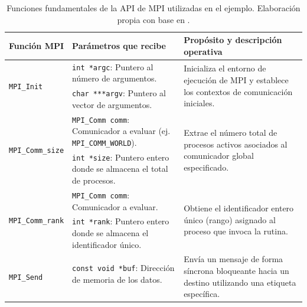 \begin{table}[h]
	\centering
	\caption{Funciones fundamentales de la API de MPI utilizadas en el ejemplo. Elaboración propia con base en \cite{grama_intro_parallel_2003, gropp_using_mpi_1999, pacheco_2011, mpi_forum_2025}.}
	\label{tab:funciones_ejemplo}
	\begin{tabular}{|l|p{6.0cm}|p{5.0cm}|}
		\hline
		\textbf{Función MPI}                      & \textbf{Parámetros que recibe}                                                  & \textbf{Propósito y descripción operativa}                                                                                     \\ \hline
		\multirow{2}{*}{\texttt{MPI\_Init}}       & \texttt{int *argc}: Puntero al número de argumentos.                            & \multirow{2}{5.0cm}{Inicializa el entorno de ejecución de MPI y establece los contextos de comunicación iniciales.}            \\ \cline{2-2}
		                                          & \texttt{char ***argv}: Puntero al vector de argumentos.                         &                                                                                                                                \\ \hline
		\multirow{2}{*}{\texttt{MPI\_Comm\_size}} & \texttt{MPI\_Comm comm}: Comunicador a evaluar (ej. \texttt{MPI\_COMM\_WORLD}). & \multirow{2}{5.0cm}{Extrae el número total de procesos activos asociados al comunicador global especificado.}                  \\ \cline{2-2}
		                                          & \texttt{int *size}: Puntero entero donde se almacena el total de procesos.      &                                                                                                                                \\ \hline
		\multirow{2}{*}{\texttt{MPI\_Comm\_rank}} & \texttt{MPI\_Comm comm}: Comunicador a evaluar.                                 & \multirow{2}{5.0cm}{Obtiene el identificador entero único (rango) asignado al proceso que invoca la rutina.}                   \\ \cline{2-2}
		                                          & \texttt{int *rank}: Puntero entero donde se almacena el identificador único.    &                                                                                                                                \\ \hline
		\multirow{6}{*}{\texttt{MPI\_Send}}       & \texttt{const void *buf}: Dirección de memoria de los datos.                    & \multirow{6}{5.0cm}{Envía un mensaje de forma síncrona bloqueante hacia un destino utilizando una etiqueta específica.}        \\ \cline{2-2}

\end{tabular}
\end{table}

